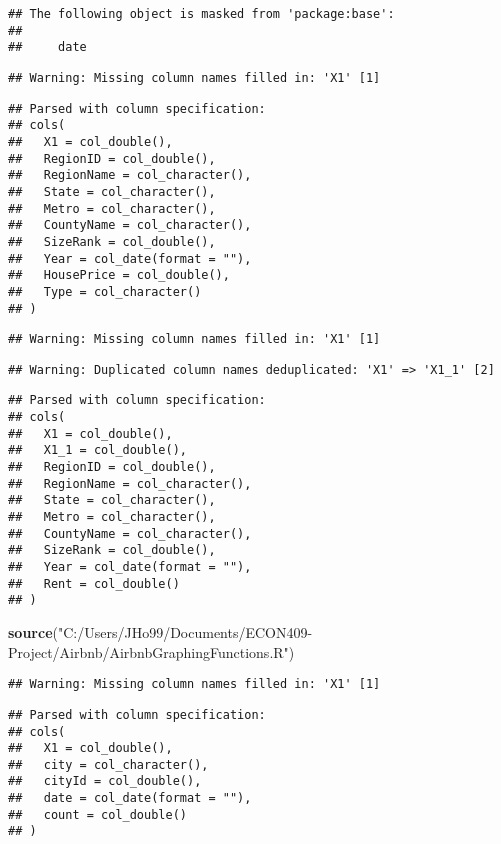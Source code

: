 \documentclass[
]{article}
\newenvironment{Shaded}{\begin{snugshade}}{\end{snugshade}}
\newcommand{\KeywordTok}[1]{\textcolor[rgb]{0.13,0.29,0.53}{\textbf{#1}}}
\newcommand{\NormalTok}[1]{#1}
\newcommand{\StringTok}[1]{\textcolor[rgb]{0.31,0.60,0.02}{#1}}
\begin{document}
\begin{verbatim}
## The following object is masked from 'package:base':
## 
##     date
\end{verbatim}

\begin{verbatim}
## Warning: Missing column names filled in: 'X1' [1]
\end{verbatim}

\begin{verbatim}
## Parsed with column specification:
## cols(
##   X1 = col_double(),
##   RegionID = col_double(),
##   RegionName = col_character(),
##   State = col_character(),
##   Metro = col_character(),
##   CountyName = col_character(),
##   SizeRank = col_double(),
##   Year = col_date(format = ""),
##   HousePrice = col_double(),
##   Type = col_character()
## )
\end{verbatim}

\begin{verbatim}
## Warning: Missing column names filled in: 'X1' [1]
\end{verbatim}

\begin{verbatim}
## Warning: Duplicated column names deduplicated: 'X1' => 'X1_1' [2]
\end{verbatim}

\begin{verbatim}
## Parsed with column specification:
## cols(
##   X1 = col_double(),
##   X1_1 = col_double(),
##   RegionID = col_double(),
##   RegionName = col_character(),
##   State = col_character(),
##   Metro = col_character(),
##   CountyName = col_character(),
##   SizeRank = col_double(),
##   Year = col_date(format = ""),
##   Rent = col_double()
## )
\end{verbatim}

\begin{Shaded}
\begin{Highlighting}[]
\KeywordTok{source}\NormalTok{(}\StringTok{"C:/Users/JHo99/Documents/ECON409-Project/Airbnb/AirbnbGraphingFunctions.R"}\NormalTok{)}
\end{Highlighting}
\end{Shaded}

\begin{verbatim}
## Warning: Missing column names filled in: 'X1' [1]
\end{verbatim}

\begin{verbatim}
## Parsed with column specification:
## cols(
##   X1 = col_double(),
##   city = col_character(),
##   cityId = col_double(),
##   date = col_date(format = ""),
##   count = col_double()
## )
\end{verbatim}
\end{document}
